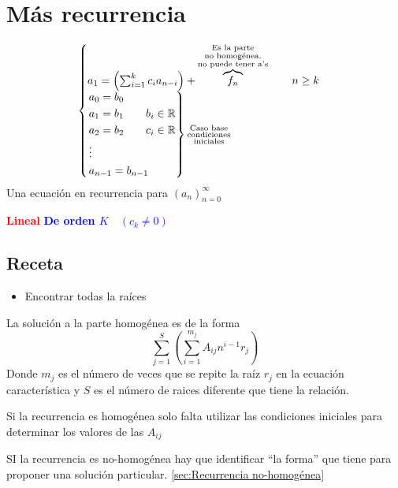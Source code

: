 \documentclass[../main.tex]{subfiles}
\begin{document}
\chapter{Más recurrencia}%

\thispagestyle{fancy}

\[
	\begin{cases}
		a_1 =
		\left(
			\sum_{i=1}^k
			c_ia_{n-i}
		\right)
		+
		\overbrace
		{
			f_n
		}^
		{
			\substack
			{
				\text{Es la parte}\\
				\text{no homogénea.}\\
				\text{no puede tener a's}
			}
		}
		\quad\quad n\geq k\\
		\begin{rcases*}
			a_0 = b_0\\
			a_1 = b_1\quad\quad b_i \in\mathbb{R}\\
			a_2 = b_2\quad\quad c_i \in\mathbb{R}\\
			\vdots\\
			a_{n-1} = b_{n-1}
		\end{rcases*}
		\substack
		{
			\text{Caso base}\\
			\text{condiciones}\\
			\text{iniciales}
		}
	\end{cases}
\]
Una ecuación en recurrencia para
\(
	\left(
		a_n
	\right)_{n=0}^\infty
\)

\textcolor{red}{\bfseries Lineal}
\textcolor{blue}{\bfseries\boldmath De orden $K\quad (c_k\neq0)$}

\section{Receta}%
\label{sec:Receta}

\begin{itemize}
	\item {}
		{Encontrar todas la raíces}
\end{itemize}
La solución a la parte homogénea es de la forma
\[
	\sum_{j=1}^{S}
	\left(
		\sum_{i=1}^{m_j}
		A_{ij}
		n^{i-1}
		r_j
	\right)
\]
Donde $m_j$ es el número de veces que se repite la raíz $r_j$ en la ecuación
característica y $S$ es el número de raices diferente que tiene la relación.

Si la recurrencia es homogénea solo falta utilizar las condiciones iniciales
para determinar los valores de las $A_{ij}$

SI la recurrencia es no-homogénea hay que identificar ``la forma''
que tiene para proponer una solución particular.
\ref{sec:Recurrencia no-homogénea}
\end{document}
